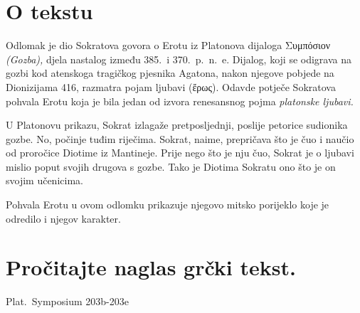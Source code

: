 


\section*{O tekstu}

Odlomak je dio Sokratova govora o Erotu iz Platonova dijaloga \textgreek[variant=ancient]{Συμπόσιον} \textit{(Gozba),} djela nastalog između 385.\ i 370.\ p.~n.~e. Dijalog, koji se odigrava na gozbi kod atenskoga tragičkog pjesnika Agatona, nakon njegove pobjede na Dionizijama 416, razmatra pojam ljubavi \textgreek[variant=ancient]{(ἔρως).} Odavde potječe Sokratova pohvala Erotu koja je bila jedan od izvora renesansnog pojma \textit{platonske ljubavi.}

U Platonovu prikazu, Sokrat izlagaže pretposljednji, poslije petorice sudionika gozbe. No, počinje tuđim riječima. Sokrat, naime, prepričava što je čuo i naučio od proročice Diotime iz Mantineje. Prije nego što je nju čuo, Sokrat je o ljubavi mislio poput svojih drugova s gozbe. Tako je Diotima Sokratu ono što je on svojim učenicima.

Pohvala Erotu u ovom odlomku prikazuje njegovo mitsko porijeklo koje je odredilo i njegov karakter.



\section*{Pročitajte naglas grčki tekst.}

Plat.\ Symposium 203b-203e


\medskip


